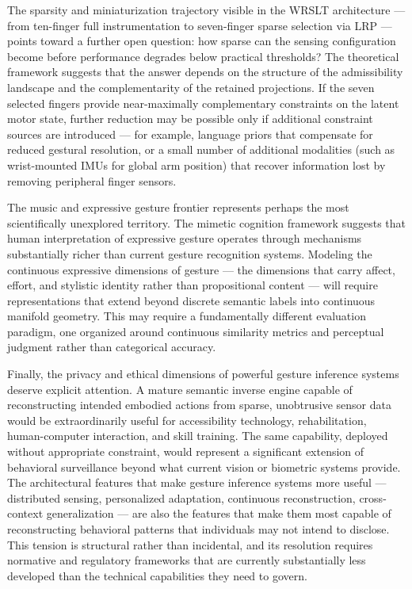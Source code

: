 \documentclass[11pt, a4paper]{article}
\theoremstyle{definition}
\begin{document}
The sparsity and miniaturization trajectory visible in the WRSLT architecture --- from ten-finger full instrumentation to seven-finger sparse selection via LRP --- points toward a further open question: how sparse can the sensing configuration become before performance degrades below practical thresholds? The theoretical framework suggests that the answer depends on the structure of the admissibility landscape and the complementarity of the retained projections. If the seven selected fingers provide near-maximally complementary constraints on the latent motor state, further reduction may be possible only if additional constraint sources are introduced --- for example, language priors that compensate for reduced gestural resolution, or a small number of additional modalities (such as wrist-mounted IMUs for global arm position) that recover information lost by removing peripheral finger sensors.

The music and expressive gesture frontier represents perhaps the most scientifically unexplored territory. The mimetic cognition framework suggests that human interpretation of expressive gesture operates through mechanisms substantially richer than current gesture recognition systems. Modeling the continuous expressive dimensions of gesture --- the dimensions that carry affect, effort, and stylistic identity rather than propositional content --- will require representations that extend beyond discrete semantic labels into continuous manifold geometry. This may require a fundamentally different evaluation paradigm, one organized around continuous similarity metrics and perceptual judgment rather than categorical accuracy.

Finally, the privacy and ethical dimensions of powerful gesture inference systems deserve explicit attention. A mature semantic inverse engine capable of reconstructing intended embodied actions from sparse, unobtrusive sensor data would be extraordinarily useful for accessibility technology, rehabilitation, human-computer interaction, and skill training. The same capability, deployed without appropriate constraint, would represent a significant extension of behavioral surveillance beyond what current vision or biometric systems provide. The architectural features that make gesture inference systems more useful --- distributed sensing, personalized adaptation, continuous reconstruction, cross-context generalization --- are also the features that make them most capable of reconstructing behavioral patterns that individuals may not intend to disclose. This tension is structural rather than incidental, and its resolution requires normative and regulatory frameworks that are currently substantially less developed than the technical capabilities they need to govern.
\end{document}
